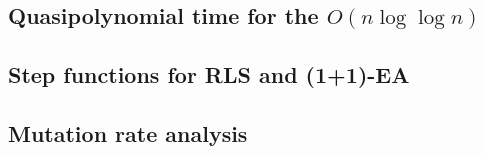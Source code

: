 \documentclass[12pt]{article}
\title{}
\author{}
\date{}
\theoremstyle{definition}
\theoremstyle{plain}
\theoremstyle{remark}
\begin{document}
\subsection{Quasipolynomial time for the $O(n \log \log n)$}

\subsection{Step functions for RLS and (1+1)-EA}

\subsection{Mutation rate analysis}
\end{document}
